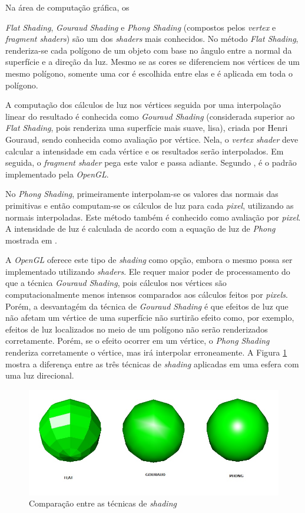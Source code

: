 	Na área de computação gráfica, os {\textit{Flat Shading}, \textit{Gouraud Shading} e \textit{Phong Shading} (compostos pelos \textit{vertex} e \textit{fragment shaders}) são um dos \textit{shaders} mais conhecidos. No método \textit{Flat Shading}, renderiza-se cada polígono de um objeto com base no ângulo entre a normal da superfície e a direção da luz. Mesmo se as cores se diferenciem nos vértices de um mesmo polígono, somente uma cor é escolhida entre elas e é aplicada em toda o polígono.  

	A computação dos cálculos de luz nos  vértices seguida por uma interpolação linear do resultado é conhecida como \textit{Gouraud Shading} (considerada superior ao \textit{Flat Shading}, pois renderiza uma superfície mais suave, lisa), criada por Henri Gouraud, sendo conhecida como avaliação por vértice. Nela, o \textit{vertex shader} deve calcular a intensidade em cada vértice e os resultados serão interpolados. Em seguida, o \textit{fragment shader} pega este valor e passa adiante. Segundo  \cite{guha2011}, é o padrão implementado pela  \textit{OpenGL}. 

	No \textit{Phong Shading}, primeiramente interpolam-se os valores das normais das primitivas e então computam-se os cálculos de luz para cada \textit{pixel}, utilizando as normais interpoladas. Este método também é conhecido como avaliação por \textit{pixel}. A intensidade de luz é calculada de acordo com a equação de luz de \textit{Phong} mostrada em \cite{guha2011}.

	 A \textit{OpenGL} oferece este tipo de \textit{shading} como opção, embora o mesmo possa ser implementado utilizando \textit{shaders}.  Ele requer maior poder de processamento do que a técnica \textit{Gouraud Shading}, pois cálculos nos vértices são computacionalmente menos intensos comparados aos cálculos feitos por \textit{pixels}. Porém, a desvantagém da técnica de \textit{Gouraud Shading} é que efeitos de luz que não afetam um vértice de uma superfície não surtirão efeito como, por exemplo, efeitos de luz localizados no meio de um polígono não serão renderizados corretamente. Porém, se o efeito ocorrer em um vértice, o \textit{Phong Shading} renderiza corretamente o vértice, mas irá interpolar erroneamente. A Figura \ref{fgp} mostra a diferença entre as três técnicas de \textit{shading} aplicadas em uma esfera com uma luz direcional. 

	\begin{figure}[h]
	\centering
		\includegraphics[keepaspectratio=true,scale=0.5]{figuras/flatgp.jpg}
	\caption{Comparação entre as técnicas de \textit{shading}}
	\label{fgp}
	\end{figure}


}
